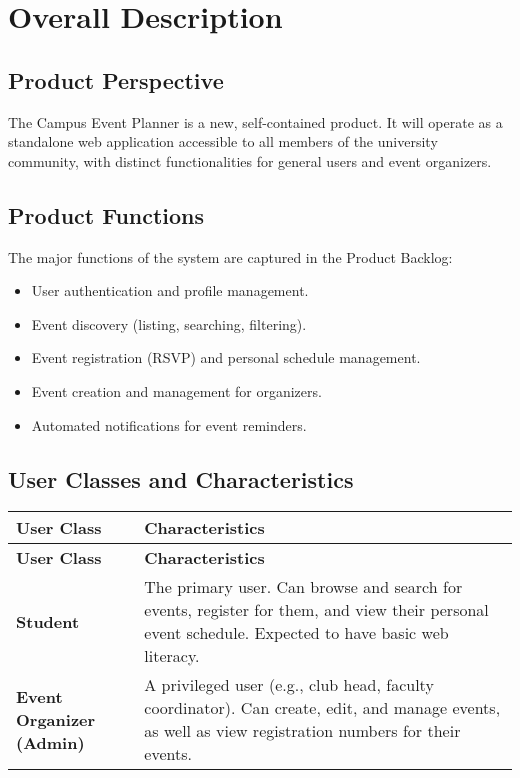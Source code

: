 \documentclass[11pt, a4paper]{article}
\begin{document}
\section{Overall Description}

\subsection{Product Perspective}
The Campus Event Planner is a new, self-contained product. It will operate as a standalone web application accessible to all members of the university community, with distinct functionalities for general users and event organizers.

\subsection{Product Functions}
The major functions of the system are captured in the Product Backlog:
\begin{itemize}
    \item User authentication and profile management.
    \item Event discovery (listing, searching, filtering).
    \item Event registration (RSVP) and personal schedule management.
    \item Event creation and management for organizers.
    \item Automated notifications for event reminders.
\end{itemize}

\subsection{User Classes and Characteristics}
\begin{longtable}{|p{4cm}|p{11cm}|}
    \hline
    \textbf{User Class} & \textbf{Characteristics} \\
    \hline
    \endfirsthead
    \hline
    \textbf{User Class} & \textbf{Characteristics} \\
    \hline
    \endhead
    \textbf{Student} & The primary user. Can browse and search for events, register for them, and view their personal event schedule. Expected to have basic web literacy. \\
    \hline
    \textbf{Event Organizer (Admin)} & A privileged user (e.g., club head, faculty coordinator). Can create, edit, and manage events, as well as view registration numbers for their events. \\
    \hline
\end{longtable}
\end{document}
